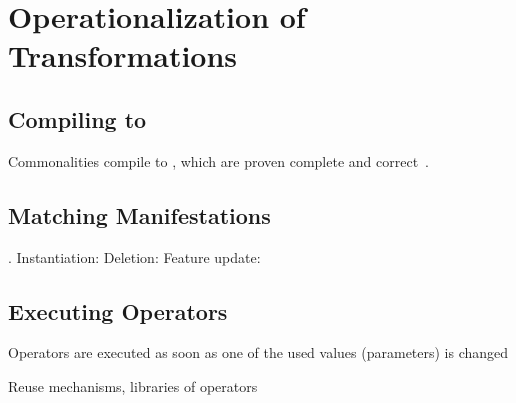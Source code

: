 \section{Operationalization of Transformations}
\label{chap:language:operationalization}

\subsection{Compiling to \reactions}
Commonalities compile to \reactions, which are proven complete and correct~\cite{kramer2017a}.


\subsection{Matching Manifestations}

\cite[Sec. 7.7.4]{kramer2017a}.
Instantiation: \cite[Alg. 1]{kramer2017a}
Deletion: \cite[Alg. 2]{kramer2017a}
Feature update: \cite[Alg. 3]{kramer2017a}


\subsection{Executing Operators}

Operators are executed as soon as one of the used values (parameters) is changed

Reuse mechanisms, libraries of operators

